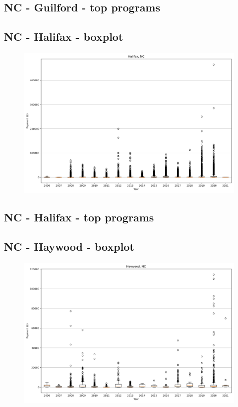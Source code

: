 \subsection*{NC - Guilford - top programs}

\newpage
\subsection*{NC - Halifax - boxplot}
\begin{figure}[h]
\centering
\includegraphics[width=7in]{../output/boxplots/counties/Halifax-NC_boxplot.png}
\end{figure}


\subsection*{NC - Halifax - top programs}

\newpage
\subsection*{NC - Haywood - boxplot}
\begin{figure}[h]
\centering
\includegraphics[width=7in]{../output/boxplots/counties/Haywood-NC_boxplot.png}
\end{figure}


